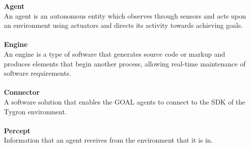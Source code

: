 \textbf{Agent}\\
An agent is an autonomous entity which observes through sensors and acts upon an environment using actuators and directs its activity towards achieving goals.\\
\\
\textbf{Engine}\\
An engine is a type of software that generates source code or markup and produces elements that begin another process, allowing real-time maintenance of software requirements.\\
\\
\textbf{Connector}\\
A software solution that enables the GOAL agents to connect to the SDK of the Tygron environment.\\
\\
\textbf{Percept}\\
Information that an agent receives from the environment that it is in.